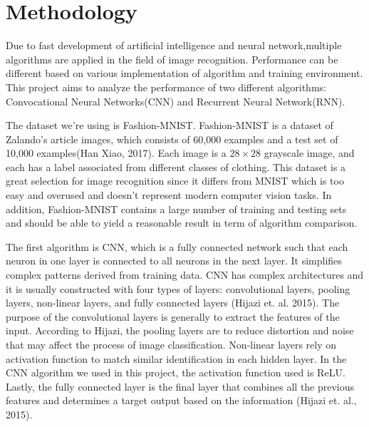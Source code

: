 \documentclass[letterpaper]{article} %
\begin{document}
\section{Methodology}

Due to fast development of artificial intelligence and neural network,multiple algorithms are applied in the field of image recognition. Performance can be different based on various implementation of algorithm and training environment. This project aims to analyze the performance of two different algorithms: Convocational Neural Networks(CNN) and Recurrent Neural Network(RNN).

The dataset we're using is Fashion-MNIST. Fashion-MNIST is a dataset of Zalando's article images, which consists of 60,000 examples and a test set of 10,000 examples(Han Xiao, 2017). Each image is a $28 \times 28$ grayscale image, and each has a label associated from different classes of clothing. This dataset is a great selection for image recognition since it differs from MNIST which is too easy and overused and doesn't represent modern computer vision tasks. In addition, Fashion-MNIST contains a large number of training and testing sets and should be able to yield a reasonable result in term of algorithm comparison.

The first algorithm is CNN, which is a fully connected network such that each neuron in one layer is connected to all neurons in the next layer. It simplifies complex patterns derived from training data. CNN has complex architectures and it is usually constructed with four types of layers: convolutional layers, pooling layers, non-linear layers, and fully connected layers (Hijazi et. al. 2015). The purpose of the convolutional layers is generally to extract the features of the input. According to Hijazi, the pooling layers are to reduce distortion and noise that may affect the process of image classification. Non-linear layers rely on activation function to match similar identification in each hidden layer. In the CNN algorithm we used in this project, the activation function used is ReLU. Lastly, the fully connected layer is the final layer that combines all the previous features and determines a target output based on the information (Hijazi et. al., 2015).
\end{document}
